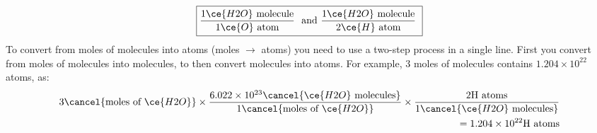 \documentclass[main.tex]{subfiles}
\begin{document}
\begin{description}
\begin{equation*}
\boxed{   \frac{1 \ce{H2O} \text{ molecule}}{1 \ce{O} \text{ atom} }\ \text{ and  } \frac{1 \ce{H2O} \text{ molecule}}{2 \ce{H} \text{ atom} }\     }
\end{equation*}
To convert from moles of molecules into atoms (moles $\rightarrow$ atoms) you need to use a two-step process in a single line. First you convert from moles of molecules into molecules, to then convert molecules into atoms. For example, 3 moles of  molecules contains $1.204\times 10^{22}$  atoms, as:
 \begin{equation*}\begin{split}
3   \cancel{\text{moles of }\ce{H2O}} \times 
\dfrac{6.022\times 10^{23} \cancel{\ce{H2O} \text{ molecules}}  } {  1\cancel{\text{moles of }\ce{H2O}}} 
\times\dfrac{2 \text{H atoms}}{1\cancel{\ce{H2O} \text{ molecules}}}
\\=1.204\times 10^{22}\text{H atoms}
\end{split}\end{equation*}



\end{description}
\end{document}
